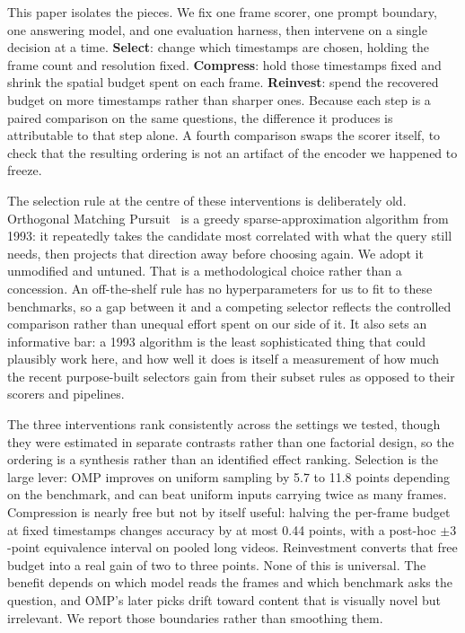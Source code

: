 \documentclass[11pt]{article}
\begin{document}
This paper isolates the pieces.
We fix one frame scorer, one prompt boundary, one answering model, and one evaluation harness, then intervene on a single decision at a time.
\textbf{Select}: change which timestamps are chosen, holding the frame count and resolution fixed.
\textbf{Compress}: hold those timestamps fixed and shrink the spatial budget spent on each frame.
\textbf{Reinvest}: spend the recovered budget on more timestamps rather than sharper ones.
Because each step is a paired comparison on the same questions, the difference it produces is attributable to that step alone.
A fourth comparison swaps the scorer itself, to check that the resulting ordering is not an artifact of the encoder we happened to freeze.

The selection rule at the centre of these interventions is deliberately old.
Orthogonal Matching Pursuit~\citep{pati1993omp} is a greedy sparse-approximation algorithm from 1993: it repeatedly takes the candidate most correlated with what the query still needs, then projects that direction away before choosing again.
We adopt it unmodified and untuned.
That is a methodological choice rather than a concession.
An off-the-shelf rule has no hyperparameters for us to fit to these benchmarks, so a gap between it and a competing selector reflects the controlled comparison rather than unequal effort spent on our side of it.
It also sets an informative bar: a 1993 algorithm is the least sophisticated thing that could plausibly work here, and how well it does is itself a measurement of how much the recent purpose-built selectors gain from their subset rules as opposed to their scorers and pipelines.

The three interventions rank consistently across the settings we tested, though they were estimated in separate contrasts rather than one factorial design, so the ordering is a synthesis rather than an identified effect ranking.
Selection is the large lever: OMP improves on uniform sampling by 5.7 to 11.8 points depending on the benchmark, and can beat uniform inputs carrying twice as many frames.
Compression is nearly free but not by itself useful: halving the per-frame budget at fixed timestamps changes accuracy by at most 0.44 points, with a post-hoc $\pm3$-point equivalence interval on pooled long videos.
Reinvestment converts that free budget into a real gain of two to three points.
None of this is universal.
The benefit depends on which model reads the frames and which benchmark asks the question, and OMP's later picks drift toward content that is visually novel but irrelevant.
We report those boundaries rather than smoothing them.
\end{document}
